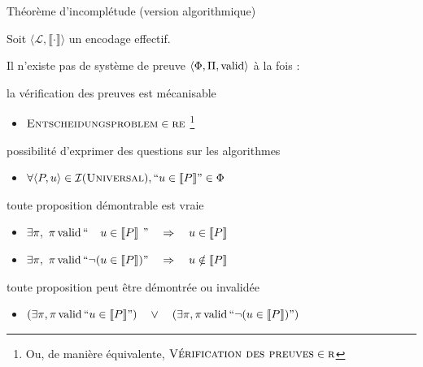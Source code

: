 
\begingroup


\begin{frame}{Théorème d'incomplétude (version algorithmique)}

  Soit $\langle \mathcal{L}, \llbracket \cdot \rrbracket \rangle$ un encodage effectif.
  
    Il n'existe pas de système de preuve $\langle \Phi, \Pi, \operatorname{valid} \rangle$ à la fois : 
    \begin{description}
    \item[Formel :] la vérification des preuves est mécanisable
      \begin{itemize}
      \item $\textsc{Entscheidungsproblem} \in \textsc{re}$
        \footnote{Ou, de manière équivalente, $\textsc{Vérification des preuves} \in \textsc{r}$}
      \end{itemize}
    \item[Turing expressif :] possibilité d'exprimer des questions sur les algorithmes
      \begin{itemize}
      \item $\forall \langle P, u \rangle \in \mathcal{I}(\textsc{Universal}), ``u \in \llbracket P \rrbracket" \in \Phi$
      \end{itemize}
    \item[Correct :] toute proposition démontrable est vraie
      \begin{itemize}
      \item $\exists \pi,~ \pi \operatorname{valid} ``\phantom{\lnot(} u \in \llbracket P \rrbracket\phantom{)}" \quad\Rightarrow\quad u \in \llbracket P \rrbracket$
      \item $\exists \pi,~ \pi \operatorname{valid} ``         \lnot(  u \in \llbracket P \rrbracket         ) " \quad\Rightarrow\quad u \notin \llbracket P \rrbracket$
      \end{itemize}
    \item[Complet :] toute proposition peut être démontrée ou invalidée
      \begin{itemize}
      \item $(\exists \pi, \pi \operatorname{valid} ``u \in \llbracket P \rrbracket") \quad \lor\quad (\exists \pi, \pi \operatorname{valid} ``\lnot(u \in \llbracket P \rrbracket)")$
      \end{itemize}
    \end{description}


\end{frame}
